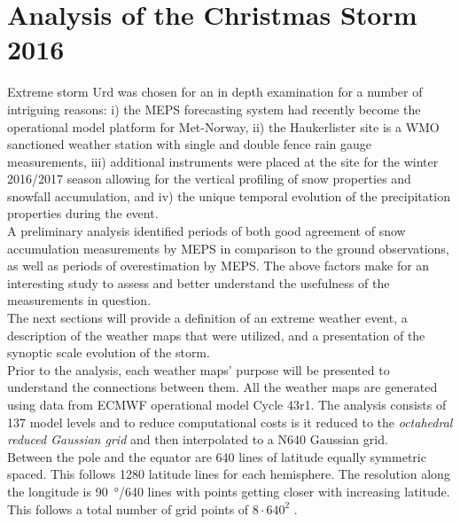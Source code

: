 \chapter{Analysis of the Christmas Storm 2016}\label{ch:weather_ana}
Extreme storm Urd was chosen for an in depth examination for a number of intriguing reasons:  i) the MEPS forecasting system had recently become the operational model platform for Met-Norway, ii) the Haukerlister site is a WMO sanctioned weather station with single and double fence rain gauge measurements, iii) additional instruments were placed at the site for the winter 2016/2017 season allowing for the vertical profiling of snow properties and snowfall accumulation, and iv) the unique temporal evolution of the precipitation properties during the event.
\\
A preliminary analysis identified periods of both good agreement of snow accumulation measurements by MEPS in comparison to the ground observations, as well as periods of overestimation by MEPS.  The above factors make for an interesting study to assess and better understand the usefulness of the measurements in question.
\\
The next sections will provide a definition of an extreme weather event, a description of the weather maps that were utilized, and a presentation of the synoptic scale evolution of the storm. \\
Prior to the analysis, each weather maps' purpose  will be presented to understand the connections between them. All the weather maps are generated using data from ECMWF operational model Cycle {43r1}. The analysis consists of 137 model levels and to reduce computational costs is it reduced to the \textit{octahedral reduced Gaussian grid} and then interpolated to a N640 Gaussian grid. 
\\
Between the pole and the equator are 640 lines of latitude equally symmetric spaced. This follows 1280 latitude lines for each hemisphere. The resolution along the longitude is \SI{90}{\degree}/640 lines with points getting closer with increasing latitude. This follows a total number of grid points of $8 \cdot 640^2$ \citep{dando_introducing_2016}.



